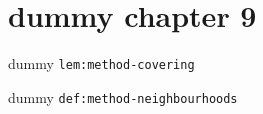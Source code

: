 \clearpage\begingroup\small
\setcounter{chapter}{9}\addtocounter{chapter}{-1}
\chapter{dummy chapter 9}
\begin{lemma}\label{lem:method-covering}dummy \texttt{lem:method-covering}\end{lemma}
\begin{definition}\label{def:method-neighbourhoods}dummy \texttt{def:method-neighbourhoods}\end{definition}
\endgroup
